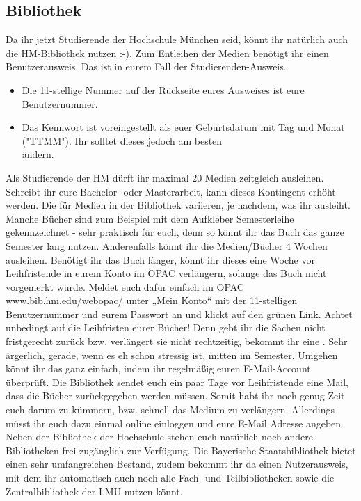 \subsection{Bibliothek}
Da ihr jetzt Studierende der Hochschule München seid, könnt ihr 
natürlich auch die HM-Bibliothek nutzen :-).
Zum Entleihen der Medien benötigt ihr einen Benutzerausweis. Das ist 
in eurem Fall der Studierenden-Ausweis.
\begin{itemize}
\item Die 11-stellige Nummer auf der Rückseite eures Ausweises ist eure 
Benutzernummer. 
\item Das Kennwort ist voreingestellt als euer Geburtsdatum mit Tag und 
Monat ("TTMM"). Ihr solltet dieses jedoch am besten\\ ändern. 
\end{itemize}
Als Studierende der HM dürft ihr maximal 20 Medien zeitgleich 
ausleihen. Schreibt ihr eure Bachelor- oder Masterarbeit, kann dieses 
Kontingent erhöht werden. Die  für Medien in der Bibliothek
variieren, je nachdem, was ihr ausleiht. Manche Bücher sind zum 
Beispiel mit dem Aufkleber \glqq Semesterleihe\grqq{} gekennzeichnet - sehr 
praktisch für euch, denn so könnt ihr das Buch das ganze Semester 
lang nutzen. Anderenfalls könnt ihr die Medien/Bücher 4 Wochen 
ausleihen. Benötigt ihr das Buch länger, könnt ihr dieses eine Woche 
vor Leihfristende in eurem Konto im OPAC verlängern, solange das 
Buch nicht vorgemerkt wurde. Meldet euch dafür einfach im OPAC \url{www.bib.hm.edu/webopac/}
unter „Mein Konto“ mit der 11-stelligen Benutzernummer und eurem 
Passwort an und klickt auf den grünen Link.\doublebreak
Achtet unbedingt auf die Leihfristen eurer Bücher! Denn gebt ihr die 
Sachen nicht fristgerecht zurück bzw. verlängert sie nicht rechtzeitig, 
bekommt ihr eine . Sehr ärgerlich,
gerade, wenn es eh schon stressig ist, mitten im Semester. \doublebreak
Umgehen könnt ihr das ganz einfach, indem ihr regelmäßig euren 
E-Mail-Account überprüft. Die Bibliothek sendet euch ein paar Tage 
vor Leihfristende eine Mail, dass die Bücher zurückgegeben werden 
müssen. Somit habt ihr noch genug Zeit euch darum zu kümmern, 
bzw. schnell das Medium zu verlängern. Allerdings müsst ihr euch dazu 
einmal online einloggen und eure E-Mail Adresse angeben.\doublebreak
Neben der Bibliothek der Hochschule stehen euch natürlich noch 
andere Bibliotheken frei zugänglich zur Verfügung. Die Bayerische 
Staatsbibliothek bietet einen sehr umfangreichen Bestand, zudem 
bekommt ihr da einen Nutzerausweis, mit dem ihr automatisch auch 
noch alle Fach- und Teilbibliotheken sowie die 
Zentralbibliothek der LMU nutzen könnt.